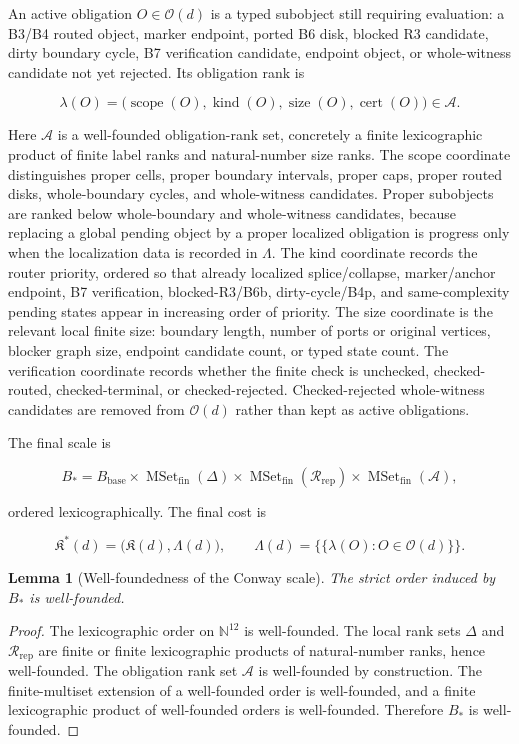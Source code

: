 \documentclass[11pt]{amsart}
\newtheorem{lemma}[theorem]{Lemma}
\theoremstyle{definition}
\begin{document}
An active obligation \(O\in\mathcal O(d)\) is a typed subobject still requiring
evaluation: a B3/B4 routed object, marker endpoint, ported B6 disk, blocked R3
candidate, dirty boundary cycle, B7 verification candidate, endpoint object, or
whole-witness candidate not yet rejected. Its obligation rank is

\[
\lambda(O)=
\bigl(
\operatorname{scope}(O),
\operatorname{kind}(O),
\operatorname{size}(O),
\operatorname{cert}(O)
\bigr)
\in \mathcal A.
\]

Here \(\mathcal A\) is a well-founded obligation-rank set, concretely a finite
lexicographic product of finite label ranks and natural-number size ranks. The
scope coordinate distinguishes proper cells, proper boundary intervals, proper
caps, proper routed disks, whole-boundary cycles, and whole-witness candidates.
Proper subobjects are ranked below whole-boundary and whole-witness candidates,
because replacing a global pending object by a proper localized obligation is
progress only when the localization data is recorded in \(\Lambda\). The kind
coordinate records the router priority, ordered so that already localized
splice/collapse, marker/anchor endpoint, B7 verification, blocked-R3/B6b,
dirty-cycle/B4p, and same-complexity pending states appear in increasing order
of priority. The size coordinate is the relevant local finite size: boundary
length, number of ports or original vertices, blocker graph size, endpoint
candidate count, or typed state count. The verification coordinate records
whether the finite check is unchecked, checked-routed, checked-terminal,
or checked-rejected. Checked-rejected whole-witness candidates are removed from
\(\mathcal O(d)\) rather than kept as active obligations.

The final scale is

\[
B_\ast=
B_{\mathrm{base}}
\times
\operatorname{MSet}_{\mathrm{fin}}(\Delta)
\times
\operatorname{MSet}_{\mathrm{fin}}(\mathcal R_{\mathrm{rep}})
\times
\operatorname{MSet}_{\mathrm{fin}}(\mathcal A),
\]

ordered lexicographically. The final cost is

\[
\mathfrak K^\ast(d)
=
\bigl(
\mathfrak K(d),
\Lambda(d)
\bigr),
\qquad
\Lambda(d)=
\{\!\{\lambda(O):O\in\mathcal O(d)\}\!\}.
\]

\begin{lemma}[Well-foundedness of the Conway scale]
The strict order induced by \(B_\ast\) is well-founded.

\end{lemma}
\begin{proof}
The lexicographic order on \(\mathbb N^{12}\) is well-founded. The
local rank sets \(\Delta\) and \(\mathcal R_{\mathrm{rep}}\) are finite or finite
lexicographic products of natural-number ranks, hence well-founded. The
obligation rank set \(\mathcal A\) is well-founded by construction. The
finite-multiset extension of a well-founded order is well-founded, and a finite
lexicographic product of well-founded orders is well-founded. Therefore
\(B_\ast\) is well-founded.

\end{proof}
\end{document}
